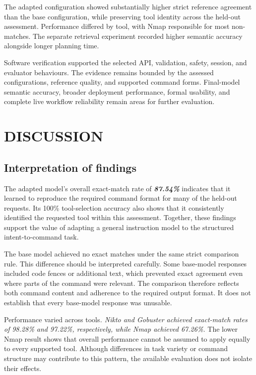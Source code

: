 \documentclass[
]{article}
\begin{document}
The adapted configuration showed substantially higher strict reference
agreement than the base configuration, while preserving tool identity
across the held-out assessment. Performance differed by tool, with Nmap
responsible for most non-matches. The separate retrieval experiment
recorded higher semantic accuracy alongside longer planning time.

Software verification supported the selected API, validation, safety,
session, and evaluator behaviours. The evidence remains bounded by the
assessed configurations, reference quality, and supported command forms.
Final-model semantic accuracy, broader deployment performance, formal
usability, and complete live workflow reliability remain areas for
further evaluation.

\hypertarget{discussion}{%
\section{\texorpdfstring{ DISCUSSION}{ DISCUSSION}}\label{discussion}}

\hypertarget{interpretation-of-findings}{%
\subsection{Interpretation of
findings}\label{interpretation-of-findings}}

The adapted model's overall exact-match rate of \emph{\textbf{87.54\%}}
indicates that it learned to reproduce the required command format for
many of the held-out requests. Its 100\% tool-selection accuracy also
shows that it consistently identified the requested tool within this
assessment. Together, these findings support the value of adapting a
general instruction model to the structured intent-to-command task.

The base model achieved no exact matches under the same strict
comparison rule. This difference should be interpreted carefully. Some
base-model responses included code fences or additional text, which
prevented exact agreement even where parts of the command were relevant.
The comparison therefore reflects both command content and adherence to
the required output format. It does not establish that every base-model
response was unusable.

Performance varied across tools\emph{. Nikto and Gobuster achieved
exact-match rates of 98.28\% and 97.22\%, respectively, while Nmap
achieved 67.26\%.} The lower Nmap result shows that overall performance
cannot be assumed to apply equally to every supported tool. Although
differences in task variety or command structure may contribute to this
pattern, the available evaluation does not isolate their effects.
\end{document}
